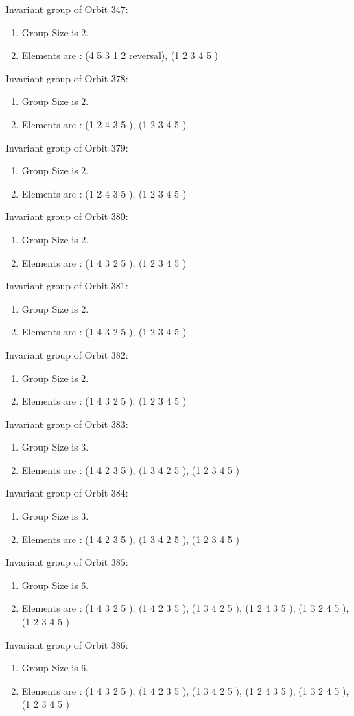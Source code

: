\documentclass[12pt]{article}
\begin{document}
Invariant group of Orbit $347$:
\begin{enumerate}
\item Group Size is $2$.
\item Elements are : (4 5 3 1 2   reversal), (1 2 3 4 5  )
\end{enumerate}
Invariant group of Orbit $378$:
\begin{enumerate}
\item Group Size is $2$.
\item Elements are : (1 2 4 3 5  ), (1 2 3 4 5  )
\end{enumerate}
Invariant group of Orbit $379$:
\begin{enumerate}
\item Group Size is $2$.
\item Elements are : (1 2 4 3 5  ), (1 2 3 4 5  )
\end{enumerate}
Invariant group of Orbit $380$:
\begin{enumerate}
\item Group Size is $2$.
\item Elements are : (1 4 3 2 5  ), (1 2 3 4 5  )
\end{enumerate}
Invariant group of Orbit $381$:
\begin{enumerate}
\item Group Size is $2$.
\item Elements are : (1 4 3 2 5  ), (1 2 3 4 5  )
\end{enumerate}
Invariant group of Orbit $382$:
\begin{enumerate}
\item Group Size is $2$.
\item Elements are : (1 4 3 2 5  ), (1 2 3 4 5  )
\end{enumerate}
Invariant group of Orbit $383$:
\begin{enumerate}
\item Group Size is $3$.
\item Elements are : (1 4 2 3 5  ), (1 3 4 2 5  ), (1 2 3 4 5  )
\end{enumerate}
Invariant group of Orbit $384$:
\begin{enumerate}
\item Group Size is $3$.
\item Elements are : (1 4 2 3 5  ), (1 3 4 2 5  ), (1 2 3 4 5  )
\end{enumerate}
Invariant group of Orbit $385$:
\begin{enumerate}
\item Group Size is $6$.
\item Elements are : (1 4 3 2 5  ), (1 4 2 3 5  ), (1 3 4 2 5  ), (1 2 4 3 5  ), (1 3 2 4 5  ), (1 2 3 4 5  )
\end{enumerate}
Invariant group of Orbit $386$:
\begin{enumerate}
\item Group Size is $6$.
\item Elements are : (1 4 3 2 5  ), (1 4 2 3 5  ), (1 3 4 2 5  ), (1 2 4 3 5  ), (1 3 2 4 5  ), (1 2 3 4 5  )
\end{enumerate}
\end{document}
